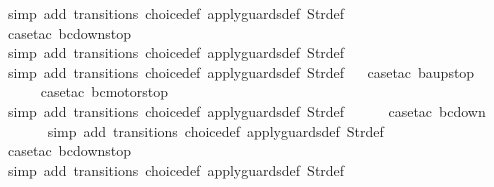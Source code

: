 \begin{isabellebody}
\ {\isacharparenleft}simp\ add{\isacharcolon}\ transitions\ choice{\isacharunderscore}def\ apply{\isacharunderscore}guards{\isacharunderscore}def\ Str{\isacharunderscore}def{\isacharparenright}\isanewline
\ \ \ \ \isamarkupfalse%
\ {\isacharparenleft}case{\isacharunderscore}tac\ {\isachardoublequoteopen}bc{\isacharequal}down{}{}stop{\isachardoublequoteclose}{\isacharparenright}\isanewline
\ \ \ \ \ \isamarkupfalse%
\ {\isacharparenleft}simp\ add{\isacharcolon}\ transitions\ choice{\isacharunderscore}def\ apply{\isacharunderscore}guards{\isacharunderscore}def\ Str{\isacharunderscore}def{\isacharparenright}\isanewline
\ \ \ \ \isamarkupfalse%
\ {\isacharparenleft}simp\ add{\isacharcolon}\ transitions\ choice{\isacharunderscore}def\ apply{\isacharunderscore}guards{\isacharunderscore}def\ Str{\isacharunderscore}def{\isacharparenright}\isanewline
\ \isamarkupfalse%
\ {\isacharparenleft}case{\isacharunderscore}tac\ {\isachardoublequoteopen}ba{\isacharequal}up{}{}stop{\isachardoublequoteclose}{\isacharparenright}\isanewline
\ \ \ \ \isamarkupfalse%
\ {\isacharparenleft}case{\isacharunderscore}tac\ {\isachardoublequoteopen}bc{\isacharequal}motorstop{}{\isachardoublequoteclose}{\isacharparenright}\isanewline
\ \ \ \ \ \isamarkupfalse%
\ {\isacharparenleft}simp\ add{\isacharcolon}\ transitions\ choice{\isacharunderscore}def\ apply{\isacharunderscore}guards{\isacharunderscore}def\ Str{\isacharunderscore}def{\isacharparenright}\isanewline
\ \ \ \ \isamarkupfalse%
\ {\isacharparenleft}case{\isacharunderscore}tac\ {\isachardoublequoteopen}bc{\isacharequal}down{}{}{\isachardoublequoteclose}{\isacharparenright}\isanewline
\ \ \ \ \ \isamarkupfalse%
\ {\isacharparenleft}simp\ add{\isacharcolon}\ transitions\ choice{\isacharunderscore}def\ apply{\isacharunderscore}guards{\isacharunderscore}def\ Str{\isacharunderscore}def{\isacharparenright}\isanewline
\ \ \ \ \isamarkupfalse%
\ {\isacharparenleft}case{\isacharunderscore}tac\ {\isachardoublequoteopen}bc{\isacharequal}down{}{}stop{\isachardoublequoteclose}{\isacharparenright}\isanewline
\ \ \ \ \ \isamarkupfalse%
\ {\isacharparenleft}simp\ add{\isacharcolon}\ transitions\ choice{\isacharunderscore}def\ apply{\isacharunderscore}guards{\isacharunderscore}def\ Str{\isacharunderscore}def{\isacharparenright}\isanewline
\ \ \isamarkupfalse%

\end{isabellebody}

